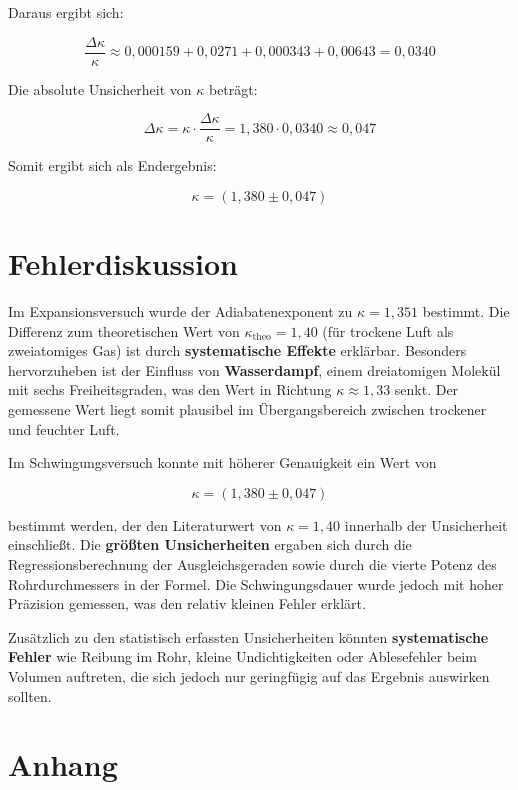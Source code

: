 \documentclass{protokoll}
\begin{document}
Daraus ergibt sich:

$$
\frac{\Delta \kappa}{\kappa} \approx 0{,}000159 + 0{,}0271 + 0{,}000343 + 0{,}00643 = 0{,}0340
$$

Die absolute Unsicherheit von $\kappa$ beträgt:

$$
\Delta \kappa = \kappa \cdot \frac{\Delta \kappa}{\kappa} = 1{,}380 \cdot 0{,}0340 \approx 0{,}047
$$

Somit ergibt sich als Endergebnis:

$$
\boxed{\kappa = (1{,}380 \pm 0{,}047)}
$$




\section{Fehlerdiskussion}

Im Expansionsversuch wurde der Adiabatenexponent zu $\kappa = 1{,}351$ bestimmt. 
Die Differenz zum theoretischen Wert von $\kappa_{\text{theo}} = 1{,}40$ 
(für trockene Luft als zweiatomiges Gas) ist durch 
\textbf{systematische Effekte} erklärbar. Besonders hervorzuheben 
ist der Einfluss von \textbf{Wasserdampf}, einem dreiatomigen Molekül mit 
sechs Freiheitsgraden, was den Wert in Richtung $\kappa \approx 1{,}33$ senkt. 
Der gemessene Wert liegt somit plausibel im Übergangsbereich zwischen trockener 
und feuchter Luft.

Im Schwingungsversuch konnte mit höherer Genauigkeit ein Wert von

$$
\kappa = (1{,}380 \pm 0{,}047)
$$

bestimmt werden, der den Literaturwert von $\kappa = 1{,}40$ innerhalb der 
Unsicherheit einschließt. Die \textbf{größten Unsicherheiten} ergaben sich 
durch die Regressionsberechnung der Ausgleichsgeraden sowie durch die vierte 
Potenz des Rohrdurchmessers in der Formel. Die Schwingungsdauer wurde jedoch 
mit hoher Präzision gemessen, was den relativ kleinen Fehler erklärt.

Zusätzlich zu den statistisch erfassten Unsicherheiten könnten 
\textbf{systematische Fehler} wie Reibung im Rohr, kleine Undichtigkeiten 
oder Ablesefehler beim Volumen auftreten, die sich jedoch nur geringfügig auf 
das Ergebnis auswirken sollten.




\section{Anhang}
\end{document}
